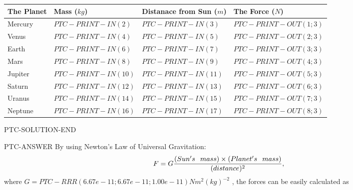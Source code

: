 \documentclass[12pt]{article}
\begin{document}
 \begin{tabular}{|l|l|l|l|}
 \hline
        The Planet & Mass ($kg$) & Distanace from Sun ($m$) & The Force ($N$)\\
 \hline
         Mercury  &
           $PTC-PRINT-IN( 2 ) $   &
             $PTC-PRINT-IN(  3) $    & $PTC-PRINT-OUT (1;  3) $
              \\  \hline
         Venus    &
           $ PTC-PRINT-IN( 4 )  $     &
             $PTC-PRINT-IN( 5 ) $    & $PTC-PRINT-OUT (2;  3) $
               \\  \hline
         Earth    &
           $ PTC-PRINT-IN( 6 )  $     &
             $PTC-PRINT-IN( 7 ) $    & $PTC-PRINT-OUT (3;  3) $
              \\   \hline
         Mars     &
           $ PTC-PRINT-IN( 8  ) $     &
             $PTC-PRINT-IN( 9 ) $    & $PTC-PRINT-OUT (4;  3) $
               \\   \hline
         Jupiter  &
           $ PTC-PRINT-IN( 10  ) $    &
             $PTC-PRINT-IN( 11 ) $    & $PTC-PRINT-OUT (5;  3) $
               \\  \hline
         Saturn   &
           $ PTC-PRINT-IN( 12  ) $    &
             $PTC-PRINT-IN( 13)  $    & $PTC-PRINT-OUT (6;  3) $
               \\  \hline
         Uranus   &
           $ PTC-PRINT-IN( 14  ) $    &
             $PTC-PRINT-IN( 15 ) $    & $PTC-PRINT-OUT (7;  3) $
               \\  \hline
         Neptune  &
           $ PTC-PRINT-IN( 16  ) $    &
             $PTC-PRINT-IN( 17 ) $    & $PTC-PRINT-OUT (8;  3) $
               \\  \hline

 \end{tabular}


PTC-SOLUTION-END


PTC-ANSWER
By using Newton's Law of Universal Gravitation:
\[
  F=G \frac{(Sun's \hspace{0.1in} mass) \times (Planet's \hspace{0.1in} mass)} { (distance)^2},
\]
where
$ G=PTC-RRR (6.67e-11 ;6.67e-11 ;1.00e-11) N m^{2}(kg)^{-2}$ , the forces can be easily calculated as

\vspace{0.2in}
\end{document}
